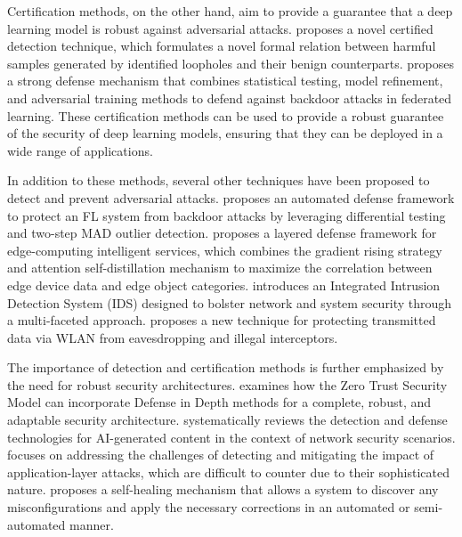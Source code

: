 \documentclass[11pt]{article}
\begin{document}
Certification methods, on the other hand, aim to provide a guarantee that a deep learning model is robust against adversarial attacks. \cite{ref89} proposes a novel certified detection technique, which formulates a novel formal relation between harmful samples generated by identified loopholes and their benign counterparts. \cite{ref83} proposes a strong defense mechanism that combines statistical testing, model refinement, and adversarial training methods to defend against backdoor attacks in federated learning. These certification methods can be used to provide a robust guarantee of the security of deep learning models, ensuring that they can be deployed in a wide range of applications.

In addition to these methods, several other techniques have been proposed to detect and prevent adversarial attacks. \cite{ref90} proposes an automated defense framework to protect an FL system from backdoor attacks by leveraging differential testing and two-step MAD outlier detection. \cite{ref91} proposes a layered defense framework for edge-computing intelligent services, which combines the gradient rising strategy and attention self-distillation mechanism to maximize the correlation between edge device data and edge object categories. \cite{ref92} introduces an Integrated Intrusion Detection System (IDS) designed to bolster network and system security through a multi-faceted approach. \cite{ref93} proposes a new technique for protecting transmitted data via WLAN from eavesdropping and illegal interceptors.

The importance of detection and certification methods is further emphasized by the need for robust security architectures. \cite{ref94} examines how the Zero Trust Security Model can incorporate Defense in Depth methods for a complete, robust, and adaptable security architecture. \cite{ref95} systematically reviews the detection and defense technologies for AI-generated content in the context of network security scenarios. \cite{ref96} focuses on addressing the challenges of detecting and mitigating the impact of application-layer attacks, which are difficult to counter due to their sophisticated nature. \cite{ref97} proposes a self-healing mechanism that allows a system to discover any misconfigurations and apply the necessary corrections in an automated or semi-automated manner.
\end{document}
